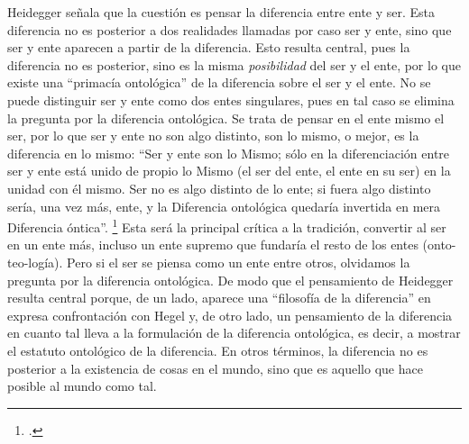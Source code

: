 Heidegger señala que la cuestión es pensar la diferencia entre ente y ser. Esta diferencia no es posterior a dos realidades llamadas por caso ser y ente, sino que ser y ente aparecen a partir de la diferencia. Esto resulta central, pues la diferencia no es posterior, sino es la misma \emph{posibilidad} del ser y el ente, por lo que existe una \enquote{primacía ontológica} de la diferencia sobre el ser y el ente. No se puede distinguir ser y ente como dos entes singulares, pues en tal caso se elimina la pregunta por la diferencia ontológica. Se trata de pensar en el ente mismo el ser, por lo que ser y ente no son algo distinto, son lo mismo, o mejor, es la diferencia en lo mismo: \enquote{Ser y ente son lo Mismo; sólo en la diferenciación entre ser y ente está unido de propio lo Mismo (el ser del ente, el ente en su ser) en la unidad con él mismo. Ser no es algo distinto de lo ente; si fuera algo distinto sería, una vez más, ente, y la Diferencia ontológica quedaría invertida en mera Diferencia óntica}. \footcites[176]{@6966-POGGELER1993}[Si ya tempranamente la cuestión de la diferencia ontológica resulta central, será su radicalización como pensamiento de la diferencia aquello que constituya un marco de referencia para la filosofía francesa. Radicalización en cuanto se trata de pensar la diferencia en cuanto diferencia. Pensamiento de la diferencia en cuanto tal que se enfrenta a una dificultad constitutiva debido a que existen diversos términos en alemán que el autor utiliza para nombrarla. Véase][]{@6990-RESTA1988} Esta será la principal crítica a la tradición, convertir al ser en un ente más, incluso un ente supremo que fundaría el resto de los entes (onto-teo-logía). Pero si el ser se piensa como un ente entre otros, olvidamos la pregunta por la diferencia ontológica. De modo que el pensamiento de Heidegger resulta central porque, de un lado, aparece una \enquote{filosofía de la diferencia} en expresa confrontación con Hegel y, de otro lado, un pensamiento de la diferencia en cuanto tal  lleva a la formulación de la diferencia ontológica, es decir, a mostrar el estatuto ontológico de la diferencia. En otros términos, la diferencia no es posterior a la existencia de cosas en el mundo, sino que es aquello que hace posible al mundo como tal.

